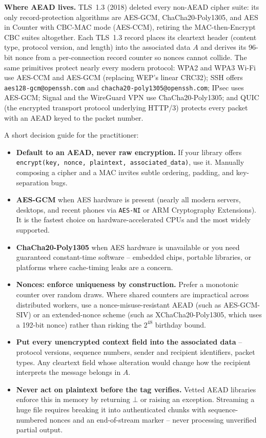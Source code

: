 \begin{applicationbox}
\textbf{Where AEAD lives.} TLS~1.3 (2018) deleted every non-AEAD cipher suite: its only record-protection algorithms are AES-GCM, ChaCha20-Poly1305, and AES in Counter with CBC-MAC mode (AES-CCM), retiring the MAC-then-Encrypt CBC suites altogether. Each TLS~1.3 record places its cleartext header (content type, protocol version, and length) into the associated data $A$ and derives its 96-bit nonce from a per-connection record counter so nonces cannot collide. The same primitives protect nearly every modern protocol: WPA2 and WPA3 Wi-Fi use AES-CCM and AES-GCM (replacing WEP's linear CRC32); SSH offers \texttt{aes128-gcm@openssh.com} and \texttt{chacha20-poly1305@openssh.com}; IPsec uses AES-GCM; Signal and the WireGuard VPN use ChaCha20-Poly1305; and QUIC (the encrypted transport protocol underlying HTTP/3) protects every packet with an AEAD keyed to the packet number.
\end{applicationbox}

A short decision guide for the practitioner:

\begin{itemize}
  \item \textbf{Default to an AEAD, never raw encryption.} If your library offers \texttt{encrypt(key, nonce, plaintext, associated\_data)}, use it. Manually composing a cipher and a MAC invites subtle ordering, padding, and key-separation bugs.
  \item \textbf{AES-GCM} when AES hardware is present (nearly all modern servers, desktops, and recent phones via \texttt{AES-NI} or ARM Cryptography Extensions). It is the fastest choice on hardware-accelerated CPUs and the most widely supported.
  \item \textbf{ChaCha20-Poly1305} when AES hardware is unavailable or you need guaranteed constant-time software -- embedded chips, portable libraries, or platforms where cache-timing leaks are a concern.
  \item \textbf{Nonces: enforce uniqueness by construction.} Prefer a monotonic counter over random draws. Where shared counters are impractical across distributed workers, use a nonce-misuse-resistant AEAD (such as AES-GCM-SIV) or an extended-nonce scheme (such as XChaCha20-Poly1305, which uses a 192-bit nonce) rather than risking the $2^{48}$ birthday bound.
  \item \textbf{Put every unencrypted context field into the associated data} -- protocol versions, sequence numbers, sender and recipient identifiers, packet types. Any cleartext field whose alteration would change how the recipient interprets the message belongs in $A$.
  \item \textbf{Never act on plaintext before the tag verifies.} Vetted AEAD libraries enforce this in memory by returning $\bot$ or raising an exception. Streaming a huge file requires breaking it into authenticated chunks with sequence-numbered nonces and an end-of-stream marker -- never processing unverified partial output.
\end{itemize}


